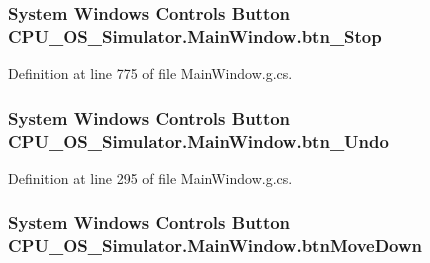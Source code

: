 \subsubsection[{btn\+\_\+\+Stop}]{\setlength{\rightskip}{0pt plus 5cm}System Windows Controls Button C\+P\+U\+\_\+\+O\+S\+\_\+\+Simulator.\+Main\+Window.\+btn\+\_\+\+Stop\hspace{0.3cm}{\ttfamily [package]}}\label{class_c_p_u___o_s___simulator_1_1_main_window_a1b6b541d9765ca230f537d1d6b6c83aa}


Definition at line 775 of file Main\+Window.\+g.\+cs.

\hypertarget{class_c_p_u___o_s___simulator_1_1_main_window_ac30720a1b345a3d59312d2d68f742359}{}
\subsubsection[{btn\+\_\+\+Undo}]{\setlength{\rightskip}{0pt plus 5cm}System Windows Controls Button C\+P\+U\+\_\+\+O\+S\+\_\+\+Simulator.\+Main\+Window.\+btn\+\_\+\+Undo\hspace{0.3cm}{\ttfamily [package]}}\label{class_c_p_u___o_s___simulator_1_1_main_window_ac30720a1b345a3d59312d2d68f742359}


Definition at line 295 of file Main\+Window.\+g.\+cs.

\hypertarget{class_c_p_u___o_s___simulator_1_1_main_window_ac6bfabebf21c92a905764305b789df46}{}
\subsubsection[{btn\+Move\+Down}]{\setlength{\rightskip}{0pt plus 5cm}System Windows Controls Button C\+P\+U\+\_\+\+O\+S\+\_\+\+Simulator.\+Main\+Window.\+btn\+Move\+Down\hspace{0.3cm}{\ttfamily [package]}}\label{class_c_p_u___o_s___simulator_1_1_main_window_ac6bfabebf21c92a905764305b789df46}


